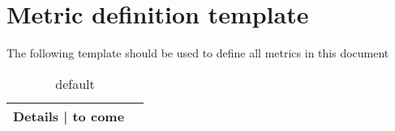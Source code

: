 \section{Metric definition template}
\label{app:metric-template}

The following template should be used to define all metrics in this document

\begin{table}[htp]
\caption{default}
\begin{center}
\begin{tabular}{|c|c|}
\hline
Details | to come \\\hline

\hline\hline
\end{tabular}
\end{center}
\label{default}
\end{table}%

